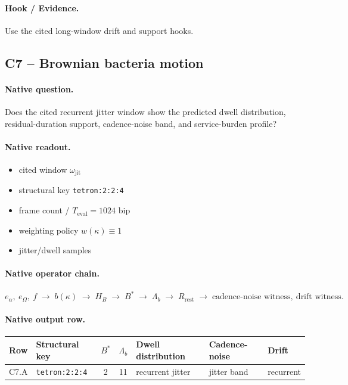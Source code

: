 \paragraph{Hook / Evidence.} Use the cited long-window drift and support hooks.


\subsection{C7 -- Brownian bacteria motion}\label{app:c7}
\paragraph{Native question.} Does the cited recurrent jitter window show the predicted dwell distribution, residual-duration support, cadence-noise band, and service-burden profile?
\paragraph{Native readout.}
\begin{itemize}
\item cited window $\omega_{\mathrm{jit}}$
\item structural key \texttt{tetron:2:2:4}
\item frame count / $T_{\mathrm{eval}}=1024$ bip
\item weighting policy $w(\kappa)\equiv 1$
\item jitter/dwell samples
\end{itemize}
\paragraph{Native operator chain.}
\[
e_\alpha,\ e_\Omega,\ f
\;\to\;
b(\kappa)
\;\to\;
H_B
\;\to\;
B^*
\;\to\;
\Lambda_b
\;\to\;
R_{\mathrm{rest}}
\;\to\;
\text{cadence-noise witness},\ \text{drift witness}.
\]
\paragraph{Native output row.}
\begin{center}
\begin{tabularx}{\linewidth}{@{}lXcclll@{}}
\toprule
Row & Structural key & $B^*$ & $\Lambda_b$ & Dwell distribution & Cadence-noise & Drift \\
\midrule
C7.A & \texttt{tetron:2:2:4} & 2 & 11 & recurrent jitter & jitter band & recurrent \\
\bottomrule
\end{tabularx}
\end{center}
